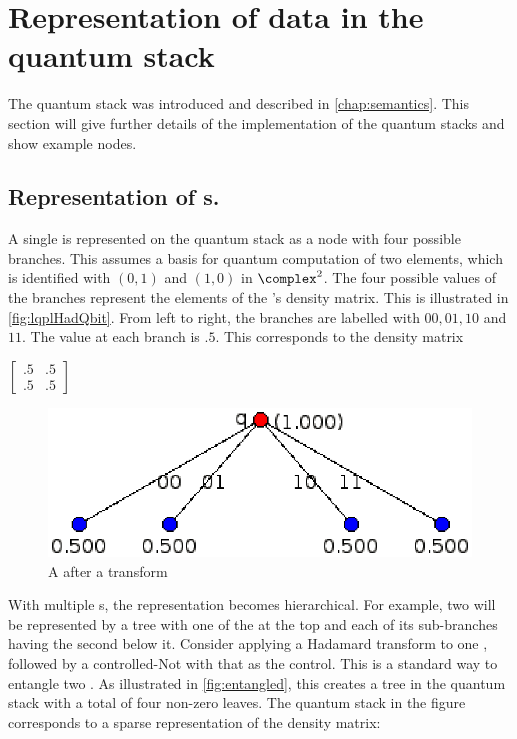 \section{Representation of data in the quantum stack}\label{subsec:representationofqstackdata}

The quantum stack was introduced and described in \ref{chap:semantics}. This
section will give further details of the implementation of the quantum
stacks and show example nodes.

\subsection{Representation of \qbit{}s.}\label{subsec:representationOfQbits}
A single \qbit{} is represented on the quantum stack as a  node with
four possible branches. This assumes a basis for quantum computation
of two elements, which is identified with $(0,1)$ and $(1,0)$ in 
 $\complex^2$. The four possible values of the branches represent
the elements of the \qbit{}'s density matrix. This is illustrated in
\vref{fig:lqplHadQbit}. From left to right, the branches are labelled with
$00, 01, 10$ and $11$. The value at each branch is $.5$. This 
corresponds to the density matrix {\begin{singlespace}
$\begin{bmatrix}.5&.5\\.5&.5\end{bmatrix}$\end{singlespace}
}

\begin{figure}[htbp]
\centerline{
\includegraphics[scale=.6]{images/HadQbit.eps}
}
\caption{A \qbit{} after a \Had{} transform}\label{fig:lqplHadQbit}
\end{figure}

With multiple \qbit{}s,  the representation becomes hierarchical.
For example, two  will be represented by a tree with one of the
\qbits{} at the top and each of its sub-branches
 having the second \qbit{} below it. 
Consider applying a Hadamard transform to one \qbit, followed by a 
controlled-Not with that \qbit{} as the control. This is 
a standard way to entangle two \qbits. As illustrated in
\vref{fig:entangled}, this creates a tree in the quantum stack with
a total of four non-zero leaves. The quantum stack in the figure
corresponds to a sparse representation of the density matrix:

